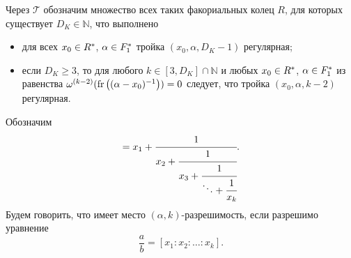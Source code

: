 \documentclass[_00_dissertation.tex]{subfiles}
\begin{document}
\begin{definition}
    Через $\mathcal{T}$ обозначим множество всех таких факориальных колец $R$, для которых существует $D_K \in \mathbb{N}$, что выполнено
    \begin{itemize}
        \item для всех $x_0 \in R^{*}$, $\alpha \in F_1^{*}$ тройка $(x_0, \alpha, D_K - 1)$ регулярная;

        \item если $D_K \ge 3$, то для любого $k \in [3, D_K] \cap \mathbb{N}$ и любых $x_0 \in R^{*}$, $\alpha \in F_1^{*}$ из равенства $\omega^{(k-2)}(\textrm{fr}\left((\alpha - x_0)^{-1}\right)) = 0$ следует, что тройка $(x_0, \alpha, k-2)$ регулярная.
    \end{itemize}
\end{definition}

\begin{definition}
    Обозначим
    \begin{equation*}
        [x_1: x_2: \dots: x_k] = x_{1} + \cfrac{1}{
            x_{2} + \cfrac{1}{
                x_{3} + \cfrac{1}{
                    \ddots + \cfrac{1}{
                        x_{k}
                    }
                }
            }
        }.
    \end{equation*}
    Будем говорить, что имеет место $(\alpha, k)$-разрешимость, если разрешимо уравнение
    \begin{equation*}
        \frac{a}{b} = [x_1: x_2: \dots: x_k].
    \end{equation*}
\end{definition}
\end{document}
